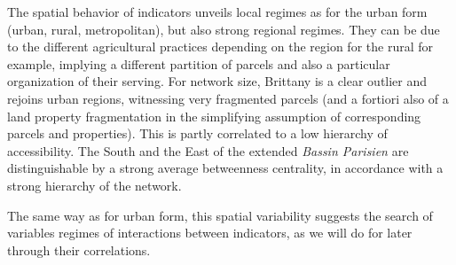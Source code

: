 The spatial behavior of indicators unveils local regimes as for the urban form (urban, rural, metropolitan), but also strong regional regimes. They can be due to the different agricultural practices depending on the region for the rural for example, implying a different partition of parcels and also a particular organization of their serving. For network size, Brittany is a clear outlier and rejoins urban regions, witnessing very fragmented parcels (and a fortiori also of a land property fragmentation in the simplifying assumption of corresponding parcels and properties). This is partly correlated to a low hierarchy of accessibility. The South and the East of the extended \emph{Bassin Parisien} are distinguishable by a strong average betweenness centrality, in accordance with a strong hierarchy of the network.

The same way as for urban form, this spatial variability suggests the search of variables regimes of interactions between indicators, as we will do for later through their correlations.





